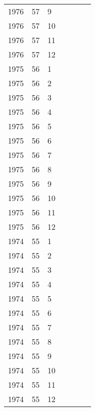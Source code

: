 \begin{longtable}{ |l|l|l|l|p{2.7cm}|l|p{2cm}| }
 1976 & 57 &     9 &         &                &  & \\
 1976 & 57 &    10 &         &                &  & \\
 1976 & 57 &    11 &         &                &  & \\
 1976 & 57 &    12 &         &                &   & \\
 1975 & 56 &     1 &         &                &  & \\
 1975 & 56 &     2 &         &                &  & \\
 1975 & 56 &     3 &         &                &  & \\
 1975 & 56 &     4 &         &                &  & \\
 1975 & 56 &     5 &         &                &  & \\
 1975 & 56 &     6 &         &                &  & \\
 1975 & 56 &     7 &         &                &  & \\
 1975 & 56 &     8 &         &                &  & \\
 1975 & 56 &     9 &         &                &  & \\
 1975 & 56 &    10 &         &                &  & \\
 1975 & 56 &    11 &         &                &  & \\
 1975 & 56 &    12 &         &                &  & \\
 1974 & 55 &     1 &         &                &  & \\
 1974 & 55 &     2 &         &                &  & \\
 1974 & 55 &     3 &         &                &  & \\
 1974 & 55 &     4 &         &                &  & \\
 1974 & 55 &     5 &         &                &  & \\
 1974 & 55 &     6 &         &                &  & \\
 1974 & 55 &     7 &         &                &  & \\
 1974 & 55 &     8 &         &                &  & \\
 1974 & 55 &     9 &         &                &  & \\
 1974 & 55 &    10 &         &                &  & \\
 1974 & 55 &    11 &         &                &  & \\
 1974 & 55 &    12 &         &                &  & \\

\end{longtable}
